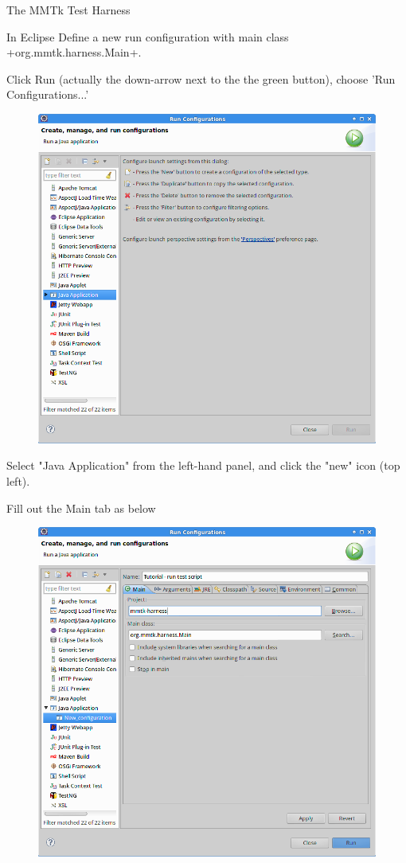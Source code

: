 \begin{section}{The MMTk Test Harness}
\begin{subsection}{In Eclipse}
Define a new run configuration with main class \spverb+org.mmtk.harness.Main+.

Click Run (actually the down-arrow next to the the green button), choose 'Run Configurations...' 
\begin{figure}[H]
  \centering
  \includegraphics[width=\textwidth]{images/TheMMTkTestHarness-RunConfigurations.png}
\end{figure}

Select "Java Application" from the left-hand panel, and click the "new" icon (top left).

Fill out the Main tab as below

\begin{figure}[H]
  \centering
  \includegraphics[width=\textwidth]{images/TheMMTkTestHarness-MainTab.png}
\end{figure}


\end{subsection}
\end{section}
